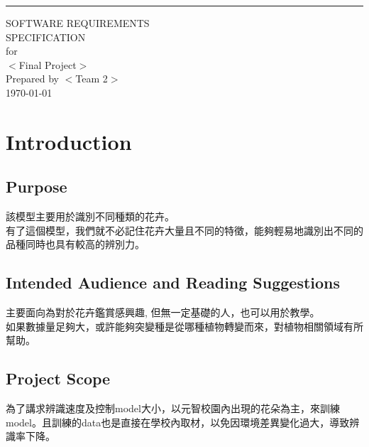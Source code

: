 \documentclass{scrreprt}
\date{}
\begin{document}
\begin{flushright}
    \rule{16cm}{5pt}\vskip1cm
    \begin{bfseries}
        \Huge{SOFTWARE REQUIREMENTS\\ SPECIFICATION}\\
        \vspace{1.9cm}
        for\\
        \vspace{1.9cm}
        $<$Final Project$>$\\
        \vspace{1.9cm}
        Prepared by $<$Team 2$>$\\
        \vspace{1.9cm}
        \today\\
    \end{bfseries}
\end{flushright}

\tableofcontents


\chapter{Introduction}

\section{Purpose}
\begin{CJK}{UTF8}{bkai}
	該模型主要用於識別不同種類的花卉。\\
	有了這個模型，我們就不必記住花卉大量且不同的特徵，能夠輕易地識別出不同的品種同時也具有較高的辨別力。
\end{CJK}

\section{Intended Audience and Reading Suggestions}
\begin{CJK}{UTF8}{bkai}
	主要面向為對於花卉鑑賞感興趣, 但無一定基礎的人，也可以用於教學。\\
如果數據量足夠大，或許能夠突變種是從哪種植物轉變而來，對植物相關領域有所幫助。
\end{CJK}

\section{Project Scope}
\begin{CJK}{UTF8}{bkai}
為了講求辨識速度及控制model大小，以元智校園內出現的花朵為主，來訓練model。且訓練的data也是直接在學校內取材，以免因環境差異變化過大，導致辨識率下降。
\end{CJK}
\end{document}
